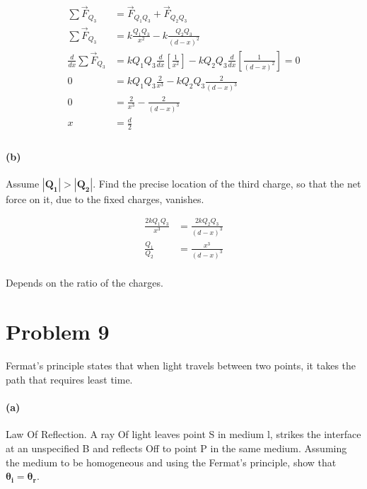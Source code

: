\documentclass[]{article}
\begin{document}
{			\begin{equation*}
				\begin{split}
					\sum \vec{F}_{Q_3} &= \vec{F}_{Q_1Q_3} + \vec{F}_{Q_2Q_3} \\
					\sum \vec{F}_{Q_3} &= k \frac{Q_1Q_3}{x^2} - k \frac{Q_2Q_3}{(d-x)^2} \\
					\frac{d}{dx} \sum \vec{F}_{Q_3} &= k Q_1 Q_3 \frac{d}{dx} \left[ \frac{1}{x^2} \right] - k Q_2 Q_3 \frac{d}{dx} \left[  \frac{1}{(d-x)^2} \right] = 0 \\
					0 &= k Q_1 Q_3 \frac{2}{x^3} - k Q_2 Q_3 \frac{2}{(d-x)^3} \\
					0 &= \frac{2}{x^3} - \frac{2}{(d-x)^3} \\
					x&= \frac{d}{2} \\
				\end{split}
			\end{equation*}

		\paragraph{(b)} Assume $\bm{|Q_1|} > \bm{|Q_2|}$. Find the precise location of the third
		charge, so that the net force on it, due to the fixed charges, vanishes.
			
			\begin{equation*}
				\begin{split}
					\frac{2k Q_1 Q_3}{x^3} &= \frac{2k Q_2 Q_3}{(d-x)^3} \\
					\frac{Q_1}{Q_2} &= \frac{x^3}{(d-x)^3} \\
				\end{split}
			\end{equation*}
		
		Depends on the ratio of the charges.

	\clearpage
	
	\section*{Problem 9}

		\paragraph{} Fermat's principle states that when light travels between two points, it takes the path that requires least time.
		
		\paragraph{(a)} Law Of Reflection. A ray Of light leaves point S in medium l, strikes the interface at an unspecified B and reflects Off to point P in the same medium. Assuming the medium to be homogeneous and using the Fermat's principle, show that $\bm{\theta_i = \theta_r}$.
		
}
\end{document}
